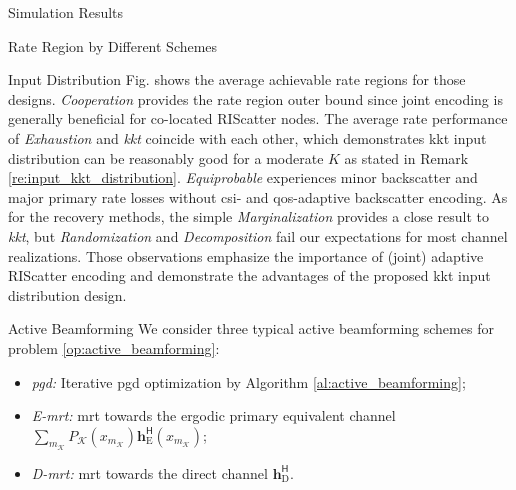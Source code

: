 \documentclass[journal]{IEEEtran}
\begin{document}
\begin{section}{Simulation Results}
\begin{subsection}{Rate Region by Different Schemes}
\begin{subsubsection}{Input Distribution}
			Fig.  shows the average achievable rate regions for those designs.
			\emph{Cooperation} provides the rate region outer bound since joint encoding is generally beneficial for co-located RIScatter nodes.
			The average rate performance of \emph{Exhaustion} and \emph{\gls{kkt}} coincide with each other, which demonstrates \gls{kkt} input distribution can be reasonably good for a moderate $K$ as stated in Remark \ref{re:input_kkt_distribution}.
			\emph{Equiprobable} experiences minor backscatter and major primary rate losses without \gls{csi}- and \gls{qos}-adaptive backscatter encoding.
			As for the recovery methods, the simple \emph{Marginalization} provides a close result to \emph{\gls{kkt}}, but \emph{Randomization} and \emph{Decomposition} fail our expectations for most channel realizations.
			Those observations emphasize the importance of (joint) adaptive RIScatter encoding and demonstrate the advantages of the proposed \gls{kkt} input distribution design.
		\end{subsubsection}

		\begin{subsubsection}{Active Beamforming}
			We consider three typical active beamforming schemes for problem \eqref{op:active_beamforming}:
			\begin{itemize}
				\item \emph{\gls{pgd}:} Iterative \gls{pgd} optimization by Algorithm \ref{al:active_beamforming};
				\item \emph{E-\gls{mrt}:} \gls{mrt} towards the ergodic primary equivalent channel $\sum_{m_{\mathcal{K}}} P_{\mathcal{K}}(x_{m_{\mathcal{K}}}) \boldsymbol{h}_{\text{E}}^\mathsf{H}(x_{m_{\mathcal{K}}})$;
				\item \emph{D-\gls{mrt}:} \gls{mrt} towards the direct channel $\boldsymbol{h}_{\text{D}}^\mathsf{H}$.
			\end{itemize}


\end{subsubsection}
\end{subsection}
\end{section}
\end{document}
